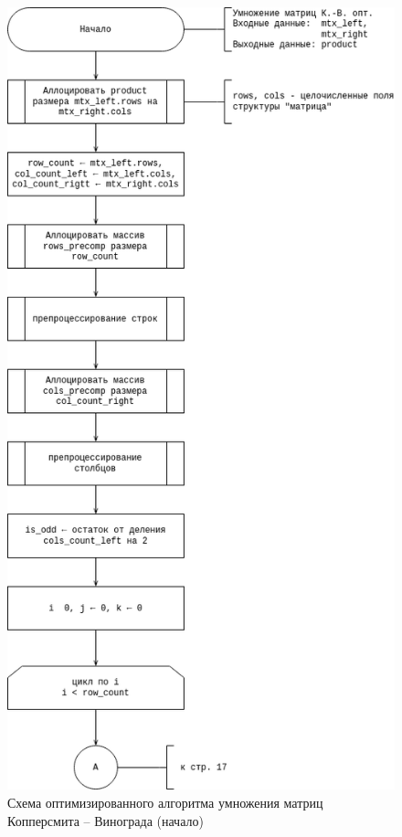 \begin{figure}[H]
	\centering
	\includegraphics[width=0.7\linewidth]{assets/mtx-win-o-1.drawio.png}
	\caption{Схема оптимизированного алгоритма умножения матриц Копперсмита -- Винограда (начало)}
	\label{fig:win-o-1}
\end{figure}


